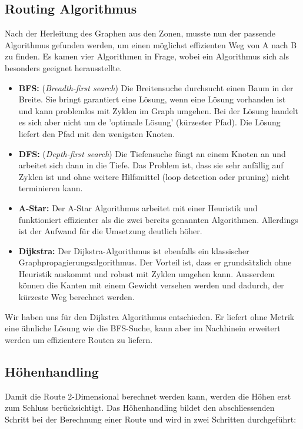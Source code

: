\subsection{Routing Algorithmus}
Nach der Herleitung des Graphen aus den Zonen, musste nun der passende Algorithmus gefunden werden, um einen möglichst effizienten Weg von A nach B zu finden. Es kamen vier Algorithmen in Frage, wobei ein Algorithmus sich als besonders geeignet herausstellte.
\begin{itemize}
	\item{\textbf{BFS:} (\textit{Breadth-first search}) Die Breitensuche durchsucht einen Baum in der Breite. Sie bringt garantiert eine Lösung, wenn eine Lösung vorhanden ist und kann problemlos mit Zyklen im Graph umgehen. Bei der Lösung handelt es sich aber nicht um de 'optimale Lösung' (kürzester Pfad). Die Lösung liefert den Pfad mit den wenigsten Knoten. \cite{AiClass}}
	\item{\textbf{DFS:} (\textit{Depth-first search}) Die Tiefensuche fängt an einem Knoten an und arbeitet sich dann in die Tiefe. Das Problem ist, dass sie sehr anfällig auf Zyklen ist und ohne weitere Hilfsmittel (loop detection oder pruning) nicht terminieren kann. \cite{AiClass}}
	\item{\textbf{A-Star:} Der A-Star Algorithmus arbeitet mit einer Heuristik und funktioniert effizienter als die zwei bereits genannten Algorithmen. Allerdings ist der Aufwand für die Umsetzung deutlich höher. \cite{AiClass}}
	\item{\textbf{Dijkstra:} Der Dijkstra-Algorithmus ist ebenfalls ein klassischer Graphpropagierungsalgorithmus. Der Vorteil ist, dass er grundsätzlich ohne Heuristik auskommt und robust mit Zyklen umgehen kann. Ausserdem können die Kanten mit einem Gewicht versehen werden und dadurch, der kürzeste Weg berechnet werden.}
\end{itemize}
Wir haben uns für den Dijkstra Algorithmus entschieden. Er liefert ohne Metrik eine ähnliche Lösung wie die BFS-Suche, kann aber im Nachhinein erweitert werden um effizientere Routen zu liefern.

\subsection{Höhenhandling}
Damit die Route 2-Dimensional berechnet werden kann, werden die Höhen erst zum Schluss berücksichtigt. Das Höhenhandling bildet den abschliessenden Schritt bei der Berechnung einer Route und wird in zwei Schritten durchgeführt:

